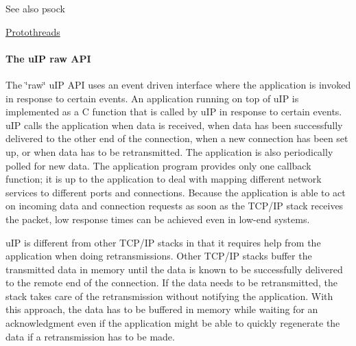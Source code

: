 \begin{DoxySeeAlso}{\-See also}
psock 

\hyperlink{a00052}{\-Protothreads}
\end{DoxySeeAlso}
\hypertarget{a00060_rawapi}{}\paragraph{\-The u\-I\-P raw A\-P\-I}\label{a00060_rawapi}
\-The \char`\"{}raw\char`\"{} u\-I\-P \-A\-P\-I uses an event driven interface where the application is invoked in response to certain events. \-An application running on top of u\-I\-P is implemented as a \-C function that is called by u\-I\-P in response to certain events. u\-I\-P calls the application when data is received, when data has been successfully delivered to the other end of the connection, when a new connection has been set up, or when data has to be retransmitted. \-The application is also periodically polled for new data. \-The application program provides only one callback function; it is up to the application to deal with mapping different network services to different ports and connections. \-Because the application is able to act on incoming data and connection requests as soon as the \-T\-C\-P/\-I\-P stack receives the packet, low response times can be achieved even in low-\/end systems.

u\-I\-P is different from other \-T\-C\-P/\-I\-P stacks in that it requires help from the application when doing retransmissions. \-Other \-T\-C\-P/\-I\-P stacks buffer the transmitted data in memory until the data is known to be successfully delivered to the remote end of the connection. \-If the data needs to be retransmitted, the stack takes care of the retransmission without notifying the application. \-With this approach, the data has to be buffered in memory while waiting for an acknowledgment even if the application might be able to quickly regenerate the data if a retransmission has to be made.

